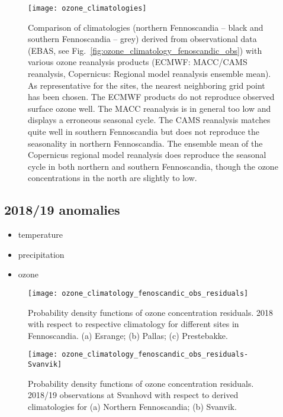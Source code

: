\documentclass[bg, manuscript]{copernicus}
\begin{document}
\begin{figure}[t]
  \texttt{[image: ozone\_climatologies]}
  \caption{Comparison of climatologies (northern Fennoscandia -- black and southern Fennoscandia -- grey) derived from observational data (EBAS, see Fig.~\ref{fig:ozone_climatology_fenoscandic_obs}) with various ozone reanalysis products (ECMWF: MACC/CAMS reanalysis, Copernicus: Regional model reanalysis ensemble mean). As representative for the sites, the nearest neighboring grid point has been chosen. The ECMWF products do not reproduce observed surface ozone well. The MACC reanalysis is in general too low and displays a erroneous seasonal cycle. The CAMS reanalysis matches quite well in southern Fennoscandia but does not reproduce the seasonality in northern Fennoscandia. The ensemble mean of the Copernicus regional model reanalysis does reproduce the seasonal cycle in both northern and southern Fennoscandia, though the ozone concentrations in the north are slightly to low.}
  \label{fig:ozone_climatologies}
\end{figure}



\subsection{2018/19 anomalies}
\begin{itemize}
\item temperature
\item precipitation
\item ozone
\end{itemize}

\begin{figure}[t]
  \texttt{[image: ozone\_climatology\_fenoscandic\_obs\_residuals]}
  \caption{Probability density functions of ozone concentration residuals. 2018 with respect to respective climatology for different sites in Fennoscandia. (a) Esrange; (b) Pallas; (c) Prestebakke.}
  \label{fig:ozone_climatology_fenoscandic_obs_residuals}
\end{figure}

\begin{figure}[t]
  \texttt{[image: ozone\_climatology\_fenoscandic\_obs\_residuals-Svanvik]}
  \caption{Probability density functions of ozone concentration residuals. 2018/19 observations at Svanhovd with respect to derived climatologies for (a) Northern Fennoscandia; (b) Svanvik.}
  \label{fig:ozone_climatology_fenoscandic_obs_residuals-Svanvik}
\end{figure}
\end{document}
